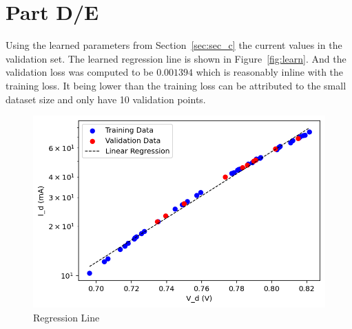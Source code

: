 \newpage
\section{Part D/E}
\label{sec:sec_de}

Using the learned parameters from Section~\ref{sec:sec_c} the current values in the validation set. The learned regression line is shown in Figure~\ref{fig:learn}. And the validation loss was computed to be $0.001394$ which is reasonably inline with the training loss. It being lower than the training loss can be attributed to the small dataset size and only have 10 validation points.  


\begin{figure}[!htpb]
	\centering
	\includegraphics{figures/fit.png}
	\caption{Regression Line}
	\label{fig:fit}
\end{figure}
